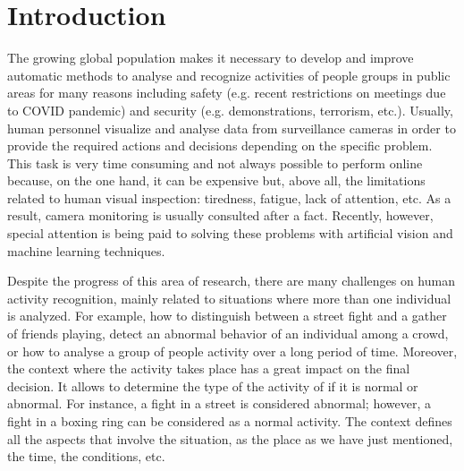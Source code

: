 \section{Introduction}\label{sec:intro}

The growing global population makes it necessary to develop and improve automatic methods to analyse and recognize activities of people groups in public areas for many reasons including safety (e.g. recent restrictions on meetings due to COVID pandemic) and security (e.g. demonstrations, terrorism, etc.). Usually, human personnel visualize and analyse data from surveillance cameras in order to provide the required actions and decisions depending on the specific problem. This task is very time consuming and not always possible to perform online because, on the one hand, it can be expensive but, above all, the limitations related to human visual inspection: tiredness, fatigue, lack of attention, etc. As a result, camera monitoring is usually consulted after a fact. Recently, however, special attention is being paid to solving these problems with artificial vision and machine learning techniques.

Despite the progress of this area of research, there are many challenges on human activity recognition, mainly related to situations where more than one individual is analyzed. For example, how to distinguish between a street fight and a gather of friends playing, detect an abnormal behavior of an individual among a crowd, or how to analyse a group of people activity over a long period of time. Moreover, the context where the activity takes place has a great impact on the final decision. It allows to determine the type of the activity of if it is normal or abnormal. For instance, a fight in a street is considered abnormal; however, a fight in a boxing ring can be considered as a normal activity. The context defines all the aspects that involve the situation, as the place as we have just mentioned, the time, the conditions, etc. 

